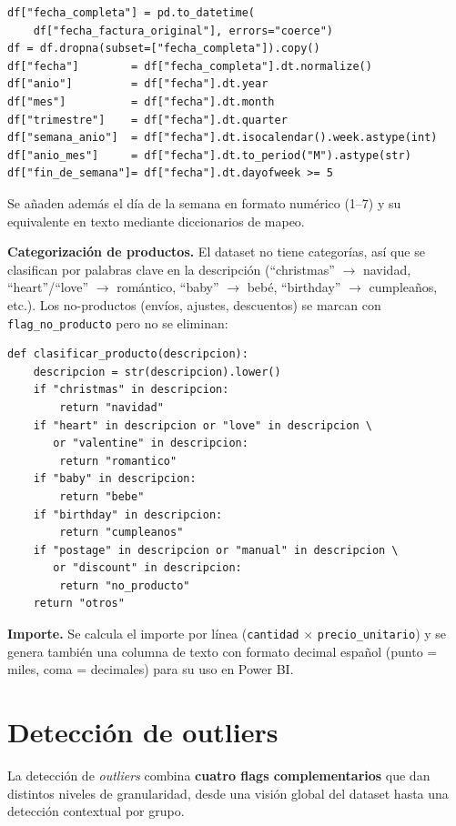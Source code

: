 \documentclass[11pt,a4paper]{article}
\begin{document}
\begin{lstlisting}
df["fecha_completa"] = pd.to_datetime(
    df["fecha_factura_original"], errors="coerce")
df = df.dropna(subset=["fecha_completa"]).copy()
df["fecha"]        = df["fecha_completa"].dt.normalize()
df["anio"]         = df["fecha"].dt.year
df["mes"]          = df["fecha"].dt.month
df["trimestre"]    = df["fecha"].dt.quarter
df["semana_anio"]  = df["fecha"].dt.isocalendar().week.astype(int)
df["anio_mes"]     = df["fecha"].dt.to_period("M").astype(str)
df["fin_de_semana"]= df["fecha"].dt.dayofweek >= 5
\end{lstlisting}

Se añaden además el día de la semana en formato numérico (1--7) y su equivalente en texto mediante diccionarios de mapeo.

\textbf{Categorización de productos.} El dataset no tiene categorías, así que se clasifican por palabras clave en la descripción (``christmas'' $\rightarrow$ navidad, ``heart''/``love'' $\rightarrow$ romántico, ``baby'' $\rightarrow$ bebé, ``birthday'' $\rightarrow$ cumpleaños, etc.). Los no-productos (envíos, ajustes, descuentos) se marcan con \texttt{flag\_no\_producto} pero no se eliminan:

\begin{lstlisting}
def clasificar_producto(descripcion):
    descripcion = str(descripcion).lower()
    if "christmas" in descripcion:
        return "navidad"
    if "heart" in descripcion or "love" in descripcion \
       or "valentine" in descripcion:
        return "romantico"
    if "baby" in descripcion:
        return "bebe"
    if "birthday" in descripcion:
        return "cumpleanos"
    if "postage" in descripcion or "manual" in descripcion \
       or "discount" in descripcion:
        return "no_producto"
    return "otros"
\end{lstlisting}

\textbf{Importe.} Se calcula el importe por línea (\texttt{cantidad} $\times$ \texttt{precio\_unitario}) y se genera también una columna de texto con formato decimal español (punto = miles, coma = decimales) para su uso en Power BI.

\section{Detección de outliers}

La detección de \textit{outliers} combina \textbf{cuatro flags complementarios} que dan distintos niveles de granularidad, desde una visión global del dataset hasta una detección contextual por grupo.
\end{document}
